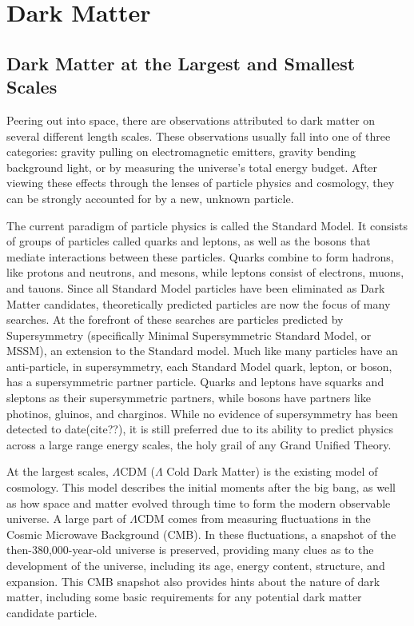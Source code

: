 \cleartooddpage[\thispagestyle{empty}]
\chapter{Dark Matter}

\section{Dark Matter at the Largest and Smallest Scales} %
  Peering out into space, there are observations attributed to dark matter on several different length scales.
  These observations usually fall into one of three categories: gravity pulling on electromagnetic emitters, gravity bending background light, or by measuring the universe's total energy budget.
  After viewing these effects through the lenses of particle physics and cosmology, they can be strongly accounted for by a new, unknown particle.

  The current paradigm of particle physics is called the Standard Model.
  It consists of groups of particles called quarks and leptons, as well as the bosons that mediate interactions between these particles.
  Quarks combine to form hadrons, like protons and neutrons, and mesons, while leptons consist of electrons, muons, and tauons.
  Since all Standard Model particles have been eliminated as Dark Matter candidates, theoretically predicted particles are now the focus of many searches.
  At the forefront of these searches are particles predicted by Supersymmetry (specifically Minimal Supersymmetric Standard Model, or MSSM), an extension to the Standard model.
  Much like many particles have an anti-particle, in supersymmetry, each Standard Model quark, lepton, or boson, has a supersymmetric partner particle.
  Quarks and leptons have squarks and sleptons as their supersymmetric partners, while bosons have partners like photinos, gluinos, and charginos.
  While no evidence of supersymmetry has been detected to date(cite??), it is still preferred due to its ability to predict physics across a large range energy scales, the holy grail of any Grand Unified Theory.

  At the largest scales, $\Lambda$CDM ($\Lambda$ Cold Dark Matter) is the existing model of cosmology.
  This model describes the initial moments after the big bang, as well as how space and matter evolved through time to form the modern observable universe.
  A large part of $\Lambda$CDM comes from measuring fluctuations in the Cosmic Microwave Background (CMB).
  In these fluctuations, a snapshot of the then-380,000-year-old universe is preserved, providing many clues as to the development of the universe, including its age, energy content, structure, and expansion. %
  This CMB snapshot also provides hints about the nature of dark matter, including some basic requirements for any potential dark matter candidate particle.

